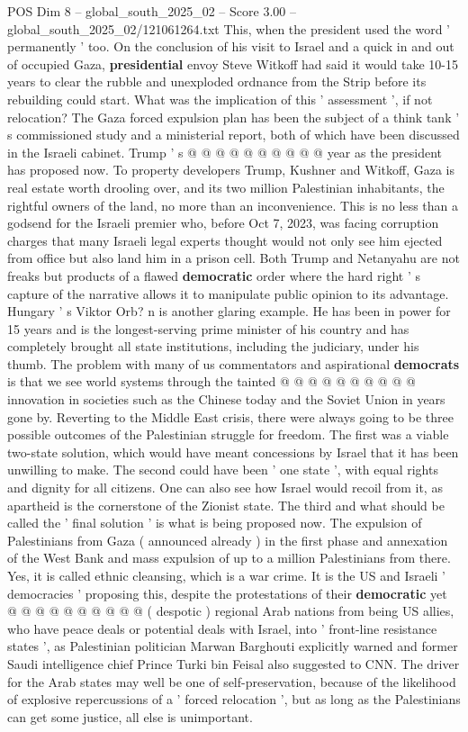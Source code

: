 \begin{textsample}{POS Dim 8 – global\_south\_2025\_02 – Score 3.00 – global\_south\_2025\_02/121061264.txt}
This, when the president used the word ' permanently ' too.
On the conclusion of his visit to Israel and a quick in and out of occupied Gaza, \textbf{presidential} envoy Steve Witkoff had said it would take 10-15 years to clear the rubble and unexploded ordnance from the Strip before its rebuilding could start.
What was the implication of this ' assessment ', if not relocation?
The Gaza forced expulsion plan has been the subject of a think tank ' s commissioned study and a ministerial report, both of which have been discussed in the Israeli cabinet.
Trump ' s @ @ @ @ @ @ @ @ @ @ year as the president has proposed now.
To property developers Trump, Kushner and Witkoff, Gaza is real estate worth drooling over, and its two million Palestinian inhabitants, the rightful owners of the land, no more than an inconvenience.
This is no less than a godsend for the Israeli premier who, before Oct 7, 2023, was facing corruption charges that many Israeli legal experts thought would not only see him ejected from office but also land him in a prison cell.
Both Trump and Netanyahu are not freaks but products of a flawed \textbf{democratic} order where the hard right ' s capture of the narrative allows it to manipulate public opinion to its advantage.
Hungary ' s Viktor Orb? n is another glaring example.
He has been in power for 15 years and is the longest-serving prime minister of his country and has completely brought all state institutions, including the judiciary, under his thumb.
The problem with many of us commentators and aspirational \textbf{democrats} is that we see world systems through the tainted @ @ @ @ @ @ @ @ @ @ innovation in societies such as the Chinese today and the Soviet Union in years gone by.
Reverting to the Middle East crisis, there were always going to be three possible outcomes of the Palestinian struggle for freedom.
The first was a viable two-state solution, which would have meant concessions by Israel that it has been unwilling to make.
The second could have been ' one state ', with equal rights and dignity for all citizens.
One can also see how Israel would recoil from it, as apartheid is the cornerstone of the Zionist state.
The third and what should be called the ' final solution ' is what is being proposed now.
The expulsion of Palestinians from Gaza ( announced already ) in the first phase and annexation of the West Bank and mass expulsion of up to a million Palestinians from there.
Yes, it is called ethnic cleansing, which is a war crime.
It is the US and Israeli ' democracies ' proposing this, despite the protestations of their \textbf{democratic} yet @ @ @ @ @ @ @ @ @ @ ( despotic ) regional Arab nations from being US allies, who have peace deals or potential deals with Israel, into ' front-line resistance states ', as Palestinian politician Marwan Barghouti explicitly warned and former Saudi intelligence chief Prince Turki bin Feisal also suggested to CNN.
The driver for the Arab states may well be one of self-preservation, because of the likelihood of explosive repercussions of a ' forced relocation ', but as long as the Palestinians can get some justice, all else is unimportant.

\end{textsample}
